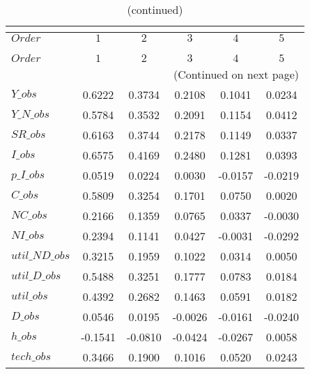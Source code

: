  
\begin{center}
\begin{longtable}{lccccc} 
\caption{COEFFICIENTS OF AUTOCORRELATION}\\
 \label{Table:th_autocorr_matrix}\\
\toprule 
$Order          $	 & 	 $          1$	 & 	 $          2$	 & 	 $          3$	 & 	 $          4$	 & 	 $          5$\\
\midrule \endfirsthead 
\caption{(continued)}\\
 \toprule \\ 
$Order          $	 & 	 $          1$	 & 	 $          2$	 & 	 $          3$	 & 	 $          4$	 & 	 $          5$\\
\midrule \endhead 
\midrule \multicolumn{6}{r}{(Continued on next page)} \\ \bottomrule \endfoot 
\bottomrule \endlastfoot 
$Y\_obs         $	 & 	     0.6222	 & 	     0.3734	 & 	     0.2108	 & 	     0.1041	 & 	     0.0234 \\ 
$Y\_N\_obs      $	 & 	     0.5784	 & 	     0.3532	 & 	     0.2091	 & 	     0.1154	 & 	     0.0412 \\ 
$SR\_obs        $	 & 	     0.6163	 & 	     0.3744	 & 	     0.2178	 & 	     0.1149	 & 	     0.0337 \\ 
$I\_obs         $	 & 	     0.6575	 & 	     0.4169	 & 	     0.2480	 & 	     0.1281	 & 	     0.0393 \\ 
$p\_I\_obs      $	 & 	     0.0519	 & 	     0.0224	 & 	     0.0030	 & 	    -0.0157	 & 	    -0.0219 \\ 
$C\_obs         $	 & 	     0.5809	 & 	     0.3254	 & 	     0.1701	 & 	     0.0750	 & 	     0.0020 \\ 
$NC\_obs        $	 & 	     0.2166	 & 	     0.1359	 & 	     0.0765	 & 	     0.0337	 & 	    -0.0030 \\ 
$NI\_obs        $	 & 	     0.2394	 & 	     0.1141	 & 	     0.0427	 & 	    -0.0031	 & 	    -0.0292 \\ 
$util\_ND\_obs  $	 & 	     0.3215	 & 	     0.1959	 & 	     0.1022	 & 	     0.0314	 & 	     0.0050 \\ 
$util\_D\_obs   $	 & 	     0.5488	 & 	     0.3251	 & 	     0.1777	 & 	     0.0783	 & 	     0.0184 \\ 
$util\_obs      $	 & 	     0.4392	 & 	     0.2682	 & 	     0.1463	 & 	     0.0591	 & 	     0.0182 \\ 
$D\_obs         $	 & 	     0.0546	 & 	     0.0195	 & 	    -0.0026	 & 	    -0.0161	 & 	    -0.0240 \\ 
$h\_obs         $	 & 	    -0.1541	 & 	    -0.0810	 & 	    -0.0424	 & 	    -0.0267	 & 	     0.0058 \\ 
$tech\_obs      $	 & 	     0.3466	 & 	     0.1900	 & 	     0.1016	 & 	     0.0520	 & 	     0.0243 \\ 
\end{longtable}
 \end{center}
